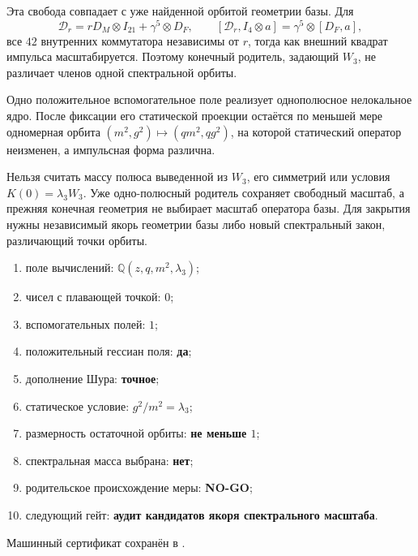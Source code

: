 Эта свобода совпадает с уже найденной орбитой геометрии базы. Для
\begin{equation}
 \mathcal D_r=rD_M\otimes I_{21}+\gamma^5\otimes D_F,
 \qquad
 [\mathcal D_r,I_4\otimes a]=\gamma^5\otimes[D_F,a],
 \label{eq:v8-baryon-spectral-parent-base-scale-recall}
\end{equation}
все $42$ внутренних коммутатора независимы от $r$, тогда как внешний
квадрат импульса масштабируется. Поэтому конечный родитель, задающий $W_3$,
не различает членов одной спектральной орбиты.

\begin{theorem}
Одно положительное вспомогательное поле реализует однополюсное нелокальное
ядро. После фиксации его статической проекции остаётся по меньшей мере
одномерная орбита $(m^2,g^2)\mapsto(qm^2,qg^2)$, на которой статический
оператор неизменен, а импульсная форма различна.
\end{theorem}

\begin{nogocriterion}
Нельзя считать массу полюса выведенной из $W_3$, его симметрий или условия
$K(0)=\lambda_3W_3$. Уже одно-полюсный родитель сохраняет свободный масштаб,
а прежняя конечная геометрия не выбирает масштаб оператора базы. Для
закрытия нужны независимый якорь геометрии базы либо новый спектральный
закон, различающий точки орбиты.
\end{nogocriterion}

\begin{protocol}
\begin{enumerate}
 \item поле вычислений: \textbf{$\mathbb Q(z,q,m^2,\lambda_3)$};
 \item чисел с плавающей точкой: \textbf{$0$};
 \item вспомогательных полей: \textbf{$1$};
 \item положительный гессиан поля: \textbf{да};
 \item дополнение Шура: \textbf{точное};
 \item статическое условие: \textbf{$g^2/m^2=\lambda_3$};
 \item размерность остаточной орбиты: \textbf{не меньше $1$};
 \item спектральная масса выбрана: \textbf{нет};
 \item родительское происхождение меры: \textbf{NO-GO};
 \item следующий гейт: \textbf{аудит кандидатов якоря спектрального масштаба}.
\end{enumerate}
\end{protocol}

Машинный сертификат сохранён в
.